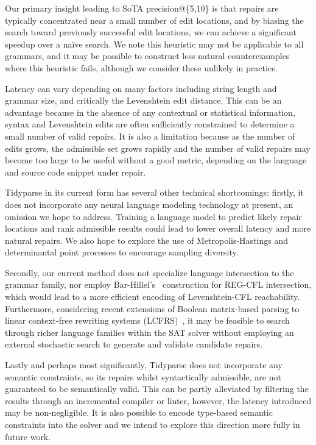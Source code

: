 \documentclass[sigplan,review,anonymous,acmsmall]{acmart}\settopmatter{printfolios=false,printccs=false,printacmref=false}
\begin{document}
  Our primary insight leading to SoTA precision@\{5,10\} is that repairs are typically concentrated near a small number of edit locations, and by biasing the search toward previously successful edit locations, we can achieve a significant speedup over a na\"ive search. We note this heuristic may not be applicable to all grammars, and it may be possible to construct less natural counterexamples where this heuristic fails, although we consider these unlikely in practice.

  Latency can vary depending on many factors including string length and grammar size, and critically the Levenshtein edit distance. This can be an advantage because in the absence of any contextual or statistical information, syntax and Levenshtein edits are often sufficiently constrained to determine a small number of valid repairs. It is also a limitation because as the number of edits grows, the admissible set grows rapidly and the number of valid repairs may become too large to be useful without a good metric, depending on the language and source code snippet under repair.

  Tidyparse in its current form has several other technical shortcomings: firstly, it does not incorporate any neural language modeling technology at present, an omission we hope to address. Training a language model to predict likely repair locations and rank admissible results could lead to lower overall latency and more natural repairs. We also hope to explore the use of Metropolis-Hastings and determinantal point processes to encourage sampling diversity.

  Secondly, our current method does not specialize language intersection to the grammar family, nor employ Bar-Hillel's~\cite{bar1961formal} construction for REG-CFL intersection, which would lead to a more efficient encoding of Levenshtein-CFL reachability. Furthermore, considering recent extensions of Boolean matrix-based parsing to linear context-free rewriting systems (LCFRS)~\cite{cohen2016parsing}, it may be feasible to search through richer language families within the SAT solver without employing an external stochastic search to generate and validate candidate repairs.

  Lastly and perhaps most significantly, Tidyparse does not incorporate any semantic constraints, so its repairs whilst syntactically admissible, are not guaranteed to be semantically valid. This can be partly alleviated by filtering the results through an incremental compiler or linter, however, the latency introduced may be non-negligible. It is also possible to encode type-based semantic constraints into the solver and we intend to explore this direction more fully in future work.
\end{document}
